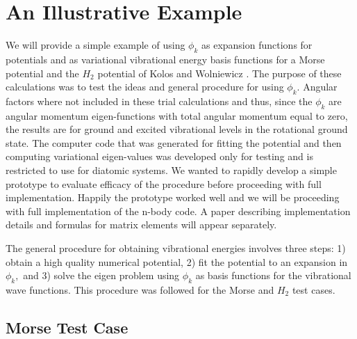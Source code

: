 \documentclass[12pt,thmsa]{article}
\begin{document}
\section{An Illustrative Example}

We will provide a simple example of using $\phi _k$ as expansion functions
for potentials and as variational vibrational energy basis functions for a
Morse potential and the $H_2$ potential of Kolos and Wolniewicz\cite{Kolos65}%
. The purpose of these calculations was to test the ideas and general
procedure for using $\phi _k$. Angular factors where not included in these
trial calculations and thus, since the $\phi _k$ are angular momentum
eigen-functions with total angular momentum equal to zero, the results are
for ground and excited vibrational levels in the rotational ground state.
The computer code that was generated for fitting the potential and then
computing variational eigen-values was developed only for testing and is
restricted to use for diatomic systems. We wanted to rapidly develop a
simple prototype to evaluate efficacy of the procedure before proceeding
with full implementation. Happily the prototype worked well and we will be
proceeding with full implementation of the n-body code. A paper describing
implementation details and formulas for matrix elements will appear
separately.

The general procedure for obtaining vibrational energies involves three
steps: 1) obtain a high quality numerical potential, 2) fit the potential to
an expansion in $\phi _k,$ and 3) solve the eigen problem using $\phi _k$ as
basis functions for the vibrational wave functions. This procedure was
followed for the Morse and $H_2$ test cases.

\subsection{Morse Test Case}
\end{document}
